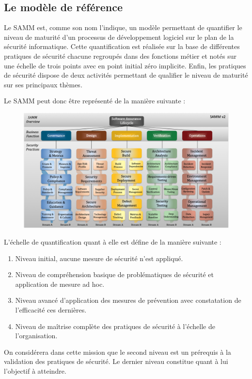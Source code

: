 \subsection{Le modèle de référence}

Le \ac{SAMM} est, comme son nom l'indique, un modèle permettant de quantifier le niveau de maturité d'un processus de 
développement logiciel sur le plan de la sécurité informatique. Cette quantification est réalisée sur la base de 
différentes pratiques de sécurité chacune regroupés dans des fonctions métier et notés sur une échelle de trois points 
avec en point initial zéro implicite. Enfin, les pratiques de sécurité dispose de deux activités permettant de qualifier
le niveau de maturité sur ses principaux thèmes.

Le \ac{SAMM} peut donc être représenté de la manière suivante :

\begin{figure}[h]
    \centering
    \includegraphics[width=1\linewidth]{resources/img/Samm_v2.png}
    \label{fig:samm-rep}
\end{figure}

\newpage

L'échelle de quantification quant à elle est défine de la manière suivante : 
\begin{enumerate}
    \item Niveau initial, aucune mesure de sécurité n'est appliqué.
    \item Niveau de compréhension basique de problématiques de sécurité et application de mesure ad hoc.
    \item Niveau avancé d'application des mesures de prévention avec constatation de l'efficacité ces dernières.
    \item Niveau de maîtrise complète des pratiques de sécurité à l'échelle de l'organisation.
\end{enumerate}
On considérera dans cette mission que le second niveau est un prérequis à la validation des pratiques de sécurité.
Le dernier niveau constitue quant à lui l'objectif à atteindre.

